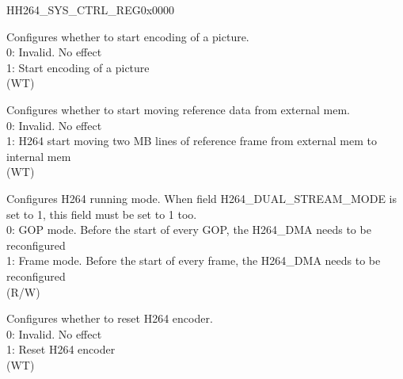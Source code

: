 \begin{register}{H}{H264\_SYS\_CTRL\_REG}{0x0000}\label{regdesc:H264SYSCTRLREG}
%
%
%
%
%
\regnewline%
\begin{regdesc}\begin{reglist}
\label{fielddesc:H264FRAMESTART}\item [H264\_FRAME\_START] Configures whether to start encoding of a picture.\\0: Invalid. No effect \\1: Start encoding of a picture \\(WT)
\label{fielddesc:H264DMAMOVESTART}\item [H264\_DMA\_MOVE\_START] Configures whether to start moving reference data from external mem.\\0: Invalid. No effect \\1: H264 start moving two MB lines of reference frame from external mem to internal mem \\(WT)
\label{fielddesc:H264FRAMEMODE}\item [H264\_FRAME\_MODE] Configures H264 running mode. When field H264\_DUAL\_STREAM\_MODE is set to 1, this field must be set to 1 too.\\0: GOP mode. Before the start of every GOP, the H264\_DMA needs to be reconfigured \\1: Frame mode. Before the start of every frame, the H264\_DMA needs to be reconfigured \\(R/W)
\label{fielddesc:H264SYSRSTPULSE}\item [H264\_SYS\_RST\_PULSE] Configures whether to reset H264 encoder.\\0: Invalid. No effect \\1: Reset H264 encoder \\(WT)
\end{reglist}\end{regdesc}
\end{register}


